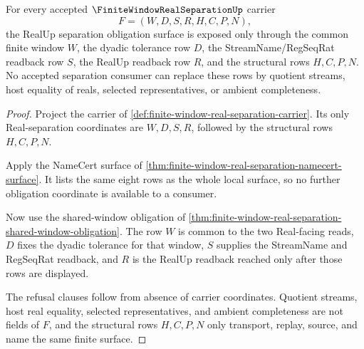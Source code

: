 \begin{theorem}
\label{thm:finite-window-real-separation-obligation-surface}
For every accepted $\FiniteWindowRealSeparationUp$ carrier
$$
F=(W,D,S,R,H,C,P,N),
$$
the RealUp separation obligation surface is exposed only through the common finite window $W$, the dyadic tolerance row $D$, the StreamName/RegSeqRat readback row $S$, the RealUp readback row $R$, and the structural rows $H,C,P,N$. No accepted separation consumer can replace these rows by quotient streams, host equality of reals, selected representatives, or ambient completeness.
\end{theorem}
\begin{proof}
Project the carrier of \autoref{def:finite-window-real-separation-carrier}. Its only Real-separation coordinates are $W,D,S,R$, followed by the structural rows $H,C,P,N$.

Apply the NameCert surface of \autoref{thm:finite-window-real-separation-namecert-surface}. It lists the same eight rows as the whole local surface, so no further obligation coordinate is available to a consumer.

Now use the shared-window obligation of \autoref{thm:finite-window-real-separation-shared-window-obligation}. The row $W$ is common to the two Real-facing reads, $D$ fixes the dyadic tolerance for that window, $S$ supplies the StreamName and RegSeqRat readback, and $R$ is the RealUp readback reached only after those rows are displayed.

The refusal clauses follow from absence of carrier coordinates. Quotient streams, host real equality, selected representatives, and ambient completeness are not fields of $F$, and the structural rows $H,C,P,N$ only transport, replay, source, and name the same finite surface.
\end{proof}

